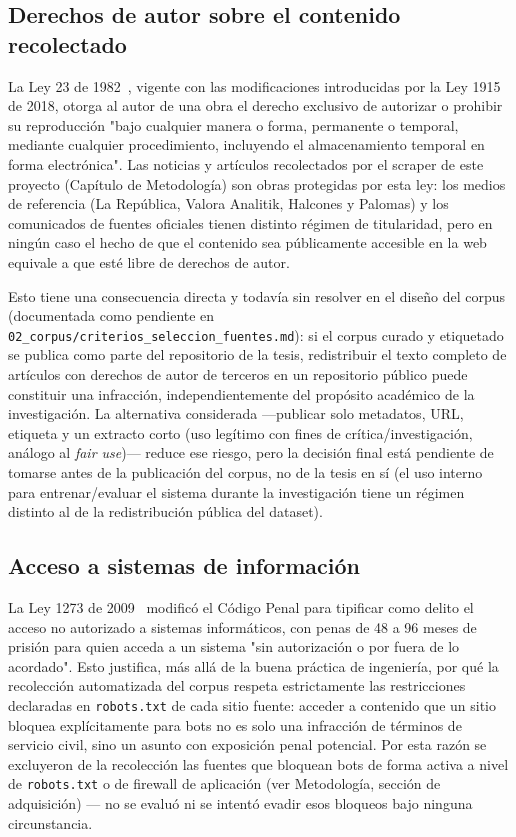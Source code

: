 \subsection{Derechos de autor sobre el contenido recolectado}

La Ley 23 de 1982~\cite{Ley231982}, vigente con las modificaciones introducidas por la Ley 1915 de 2018, otorga al autor de una obra el derecho exclusivo de autorizar o prohibir su reproducción "bajo cualquier manera o forma, permanente o temporal, mediante cualquier procedimiento, incluyendo el almacenamiento temporal en forma electrónica". Las noticias y artículos recolectados por el scraper de este proyecto (Capítulo de Metodología) son obras protegidas por esta ley: los medios de referencia (La República, Valora Analitik, Halcones y Palomas) y los comunicados de fuentes oficiales tienen distinto régimen de titularidad, pero en ningún caso el hecho de que el contenido sea públicamente accesible en la web equivale a que esté libre de derechos de autor.

Esto tiene una consecuencia directa y todavía sin resolver en el diseño del corpus (documentada como pendiente en \texttt{02\_corpus/criterios\_seleccion\_fuentes.md}): si el corpus curado y etiquetado se publica como parte del repositorio de la tesis, redistribuir el texto completo de artículos con derechos de autor de terceros en un repositorio público puede constituir una infracción, independientemente del propósito académico de la investigación. La alternativa considerada —publicar solo metadatos, URL, etiqueta y un extracto corto (uso legítimo con fines de crítica/investigación, análogo al \textit{fair use})— reduce ese riesgo, pero la decisión final está pendiente de tomarse antes de la publicación del corpus, no de la tesis en sí (el uso interno para entrenar/evaluar el sistema durante la investigación tiene un régimen distinto al de la redistribución pública del dataset).

\subsection{Acceso a sistemas de información}

La Ley 1273 de 2009~\cite{Ley12732009} modificó el Código Penal para tipificar como delito el acceso no autorizado a sistemas informáticos, con penas de 48 a 96 meses de prisión para quien acceda a un sistema "sin autorización o por fuera de lo acordado". Esto justifica, más allá de la buena práctica de ingeniería, por qué la recolección automatizada del corpus respeta estrictamente las restricciones declaradas en \texttt{robots.txt} de cada sitio fuente: acceder a contenido que un sitio bloquea explícitamente para bots no es solo una infracción de términos de servicio civil, sino un asunto con exposición penal potencial. Por esta razón se excluyeron de la recolección las fuentes que bloquean bots de forma activa a nivel de \texttt{robots.txt} o de firewall de aplicación (ver Metodología, sección de adquisición) — no se evaluó ni se intentó evadir esos bloqueos bajo ninguna circunstancia.

